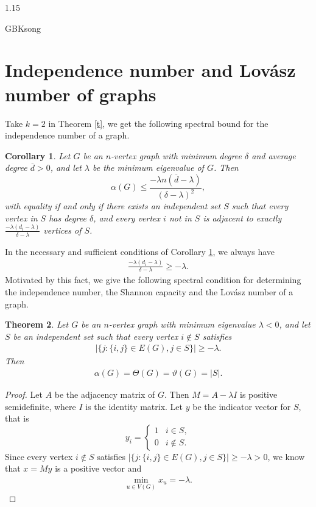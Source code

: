 \documentclass[preprint,12pt]{elsarticle}
\newtheorem{thm}{Theorem}[section]
\newtheorem{cor}[thm]{Corollary}
\begin{document}
\begin{spacing}{1.15}
\begin{CJK*}{GBK}{song}
\section{Independence number and Lov\'{a}sz number of graphs}
Take $k=2$ in Theorem \ref{t}, we get the following spectral bound for the independence number of a graph.
\begin{cor}\label{2}
Let $G$ be an $n$-vertex graph with minimum degree $\delta$ and average degree $\overline{d}>0$, and let $\lambda$ be the minimum eigenvalue of $G$. Then
$$\alpha(G)\leq\frac{-\lambda n(\overline{d} - \lambda)}{(\delta - \lambda)^{2}},$$
with equality if and only if there exists an independent set $S$ such that every vertex in $S$ has degree $\delta$, and every vertex $i$ not in $S$ is adjacent to exactly $\frac{-\lambda(d_i - \lambda)}{\delta - \lambda}$ vertices of $S$.
\end{cor}
In the necessary and sufficient conditions of Corollary \ref{2}, we always have
\begin{eqnarray*}
\frac{-\lambda(d_i-\lambda)}{\delta-\lambda}\geq-\lambda.
\end{eqnarray*}
Motivated by this fact, we give the following spectral condition for determining the independence number, the Shannon capacity and the Lov\'{a}sz number of a graph.
\begin{thm}\label{theta2}
Let $G$ be an $n$-vertex graph with minimum eigenvalue $\lambda<0$, and let $S$ be an independent set such that every vertex $i\notin S$ satisfies
\begin{eqnarray*}
|\{j:\{i,j\}\in E(G),j\in S\}|\geq-\lambda.
\end{eqnarray*}
Then
\begin{eqnarray*}
\alpha(G) = \Theta(G) = \vartheta(G) = |S|.
\end{eqnarray*}
\end{thm}
\begin{proof}
Let $A$ be the adjacency matrix of $G$. Then $M=A-\lambda I$ is positive semidefinite, where $I$ is the identity matrix. Let $y$ be the indicator vector for $S$, that is
$${y_i} =
\begin{cases}
1 & i \in S,\\
0 & i \notin S.
\end{cases}
$$
Since every vertex $i\notin S$ satisfies $|\{j:\{i,j\}\in E(G),j\in S\}|\geq-\lambda>0$, we know that $x=My$ is a positive vector and
\begin{eqnarray*}
\min_{u\in V(G)}x_u=-\lambda.
\end{eqnarray*}

\end{proof}
\end{CJK*}
\end{spacing}
\end{document}
